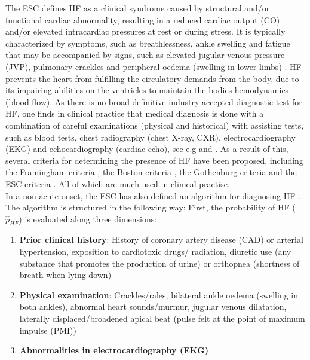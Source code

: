 \documentclass[../thesis.tex]{subfiles}
\begin{document}
\noindent The ESC defines HF as a clinical syndrome caused by structural and/or functional cardiac abnormality, resulting in a reduced cardiac output (CO) and/or elevated intracardiac pressures at rest or during stress. It is typically characterized by symptoms, such as breathlessness, ankle swelling and fatigue that may be accompanied by signs, such as elevated jugular venous pressure (JVP), pulmonary crackles and peripheral oedema (swelling in lower limbs) \citep{ponikowski2016}. HF prevents the heart from fulfilling the circulatory demands from the body, due to its impairing abilities on the ventricles to maintain the bodies hemodynamics (blood flow). As there is no broad definitive industry accepted diagnostic test for HF, one finds in clinical practice that medical diagnosis is done with a combination of careful examinations (physical and historical) with assisting tests, such as blood tests, chest radiography (chest X-ray, CXR), electrocardiography (EKG) and echocardiography (cardiac echo), see e.g \cite{henein2010heart} and \cite{son2012decision}. As a result of this, several criteria for determining the presence of HF have been proposed, including the Framingham criteria \citep{mckee1971natural}, the Boston criteria \citep{carlson1985analysis}, the Gothenburg criteria \citep{eriksson1987cardiac} and the ESC criteria \citep{swedberg2005guidelines} \citep{roger2010heart}. All of which are much used in clinical practise.\\
\indent In a non-acute onset, the ESC has also defined an algorithm for diagnosing HF \citep{ponikowski2016}. The algorithm is structured in the following way: First, the probability of HF ($\hat{p}_{HF}$) is evaluated along three dimensions: 
\begin{enumerate}[label=(\roman*)]
    \item \textbf{Prior clinical history}: History of coronary artery disease (CAD) or arterial hypertension, exposition to cardiotoxic drugs/ radiation, diuretic use (any substance that promotes the production of urine) or orthopnea (shortness of breath when lying down)
    \item \textbf{Physical examination}: Crackles/rales, bilateral ankle oedema (swelling in both ankles), abnormal heart sounds/murmur, jugular venous dilatation, laterally displaced/broadened apical beat (pulse felt at the point of maximum impulse (PMI))
    \item \textbf{Abnormalities in electrocardiography (EKG)}
\end{enumerate}
\end{document}
